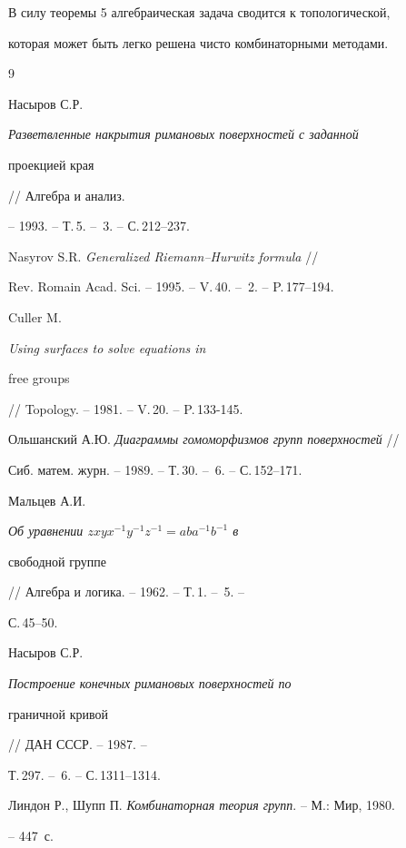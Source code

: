 В силу теоремы 5 алгебраическая задача сводится к топологической, 


которая может быть легко решена чисто комбинаторными методами.





\begin{thebibliography}{9}







Насыров С.Р. {\em Разветвленные накрытия римановых поверхностей с заданной 


проекцией края} // Алгебра и анализ.


-- 1993. -- Т.\,5. -- \No\,3. -- С.\,212--237.




Nasyrov S.R. {\em Generalized Riemann--Hurwitz formula} //


Rev. Romain Acad. Sci. -- 1995. -- V.\,40. -- \No\,2. -- P.\,177--194.




Culler M. {\em Using surfaces to solve equations in


free groups} // Topology. -- 1981. -- V.\,20. -- P.\,133-145.




Ольшанский А.Ю. {\em Диаграммы гомоморфизмов групп поверхностей} // 


Сиб. матем. журн. -- 1989. -- Т.\,30. -- \No\,6. -- С.\,152--171.




Мальцев А.И. {\em Об уравнении $zxyx^{-1}y^{-1}z^{-1}=aba^{-1}b^{-1}$ в


свободной группе} // Алгебра и логика. -- 1962. -- Т.\,1. -- \No\,5. --


С.\,45--50.




Насыров С.Р. {\em Построение конечных римановых поверхностей по


граничной кривой} // ДАН СССР. -- 1987. --


Т.\,297. -- \No\,6. -- С.\,1311--1314.




Линдон Р., Шупп П. {\em Комбинаторная теория групп}. -- М.: Мир, 1980.


-- 447~с.





\end{thebibliography}






